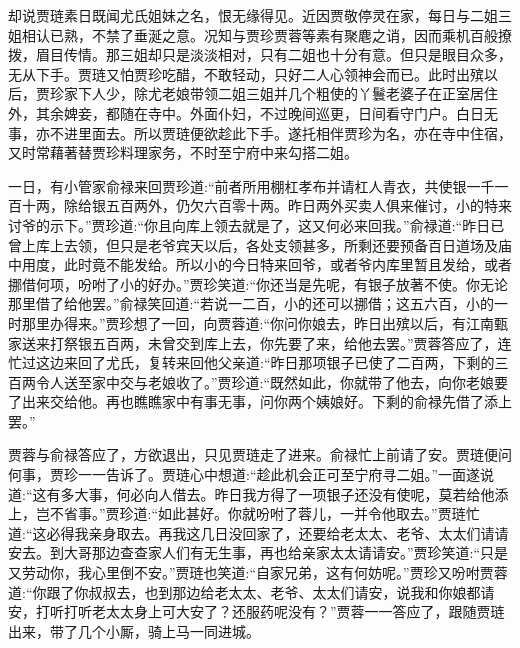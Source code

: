 \begin{parag}
    却说贾琏素日既闻尤氏姐妹之名，恨无缘得见。近因贾敬停灵在家，每日与二姐三姐相认已熟，不禁了垂涎之意。况知与贾珍贾蓉等素有聚麀之诮，因而乘机百般撩拨，眉目传情。那三姐却只是淡淡相对，只有二姐也十分有意。但只是眼目众多，无从下手。贾琏又怕贾珍吃醋，不敢轻动，只好二人心领神会而已。此时出殡以后，贾珍家下人少，除尤老娘带领二姐三姐并几个粗使的丫鬟老婆子在正室居住外，其余婢妾，都随在寺中。外面仆妇，不过晚间巡更，日间看守门户。白日无事，亦不进里面去。所以贾琏便欲趁此下手。遂托相伴贾珍为名，亦在寺中住宿，又时常藉著替贾珍料理家务，不时至宁府中来勾搭二姐。
\end{parag}


\begin{parag}
    一日，有小管家俞禄来回贾珍道:“前者所用棚杠孝布并请杠人青衣，共使银一千一百十两，除给银五百两外，仍欠六百零十两。昨日两外买卖人俱来催讨，小的特来讨爷的示下。”贾珍道:“你且向库上领去就是了，这又何必来回我。”俞禄道:“昨日已曾上库上去领，但只是老爷宾天以后，各处支领甚多，所剩还要预备百日道场及庙中用度，此时竟不能发给。所以小的今日特来回爷，或者爷内库里暂且发给，或者挪借何项，吩咐了小的好办。”贾珍笑道:“你还当是先呢，有银子放著不使。你无论那里借了给他罢。”俞禄笑回道:“若说一二百，小的还可以挪借；这五六百，小的一时那里办得来。”贾珍想了一回，向贾蓉道:“你问你娘去，昨日出殡以后，有江南甄家送来打祭银五百两，未曾交到库上去，你先要了来，给他去罢。”贾蓉答应了，连忙过这边来回了尤氏，复转来回他父亲道:“昨日那项银子已使了二百两，下剩的三百两令人送至家中交与老娘收了。”贾珍道:“既然如此，你就带了他去，向你老娘要了出来交给他。再也瞧瞧家中有事无事，问你两个姨娘好。下剩的俞禄先借了添上罢。”
\end{parag}


\begin{parag}
    贾蓉与俞禄答应了，方欲退出，只见贾琏走了进来。俞禄忙上前请了安。贾琏便问何事，贾珍一一告诉了。贾琏心中想道:“趁此机会正可至宁府寻二姐。”一面遂说道:“这有多大事，何必向人借去。昨日我方得了一项银子还没有使呢，莫若给他添上，岂不省事。”贾珍道:“如此甚好。你就吩咐了蓉儿，一并令他取去。”贾琏忙道:“这必得我亲身取去。再我这几日没回家了，还要给老太太、老爷、太太们请请安去。到大哥那边查查家人们有无生事，再也给亲家太太请请安。”贾珍笑道:“只是又劳动你，我心里倒不安。”贾琏也笑道:“自家兄弟，这有何妨呢。”贾珍又吩咐贾蓉道:“你跟了你叔叔去，也到那边给老太太、老爷、太太们请安，说我和你娘都请安，打听打听老太太身上可大安了？还服药呢没有？”贾蓉一一答应了，跟随贾琏出来，带了几个小厮，骑上马一同进城。
\end{parag}


